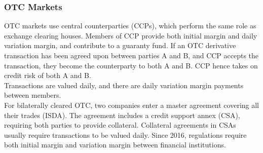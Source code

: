 \subsubsection{OTC Markets}

OTC markets use central counterparties (CCPs), which perform the same role as exchange clearing houses. Members of CCP provide both initial margin and daily variation margin, and contribute to a guaranty fund. If an OTC derivative transaction has been agreed upon between parties A and B, and CCP accepts the transaction, they become the counterparty to both A and B. CCP hence takes on credit risk of both A and B.\\
Transactions are valued daily, and there are daily variation margin payments between members.\\

For bilaterally cleared OTC, two companies enter a master agreement covering all their trades (ISDA). The agreement includes a credit support annex (CSA), requiring both parties to provide collateral. Collateral agreements in CSAs usually require transactions to be valued daily. Since 2016, regulations require both initial margin and variation margin between financial institutions.






